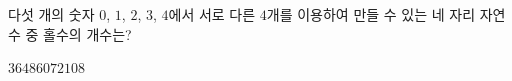 \hspace*{2mm}\begin{minipage}[t]{\dimexpr\linewidth-2mm\relax}\vspace{0pt}
다섯 개의 숫자 $0$, $1$, $2$, $3$, $4$에서 서로 다른 $4$개를 이용하여 만들 수 있는 네 자리 자연수 중 홀수의 개수는?
\begin{choices32}{$36$}{$48$}{$60$}{$72$}{$108$}\end{choices32}\end{minipage}
